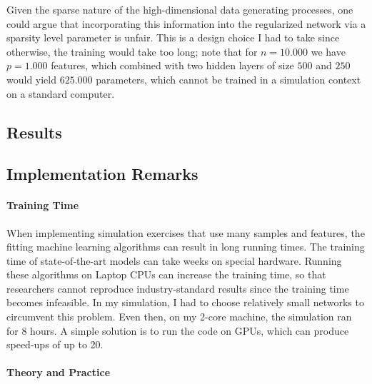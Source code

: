 \begin{remark}
    Given the sparse nature of the high-dimensional data generating processes, one could
    argue that incorporating this information into the regularized network via a
    sparsity level parameter is unfair. This is a design choice I had to take since
    otherwise, the training would take too long; note that for $n = 10.000$ we have $p =
    1.000$ features, which combined with two hidden layers of size $500$ and $250$ would
    yield $625.000$ parameters, which cannot be trained in a simulation context on a
    standard computer.
\end{remark}

\subsection{Results}

\subsection*{Implementation Remarks}

\paragraph{Training Time}

When implementing simulation exercises that use many samples and features, the fitting
machine learning algorithms can result in long running times. The training time of
state-of-the-art models can take weeks on special hardware. Running these algorithms on
Laptop CPUs can increase the training time, so that researchers cannot reproduce
industry-standard results since the training time becomes infeasible. In my simulation,
I had to choose relatively small networks to circumvent this problem. Even then, on my
2-core machine, the simulation ran for 8 hours. A simple solution is to run the code on
GPUs, which can produce speed-ups of up to 20.

\paragraph{Theory and Practice}

